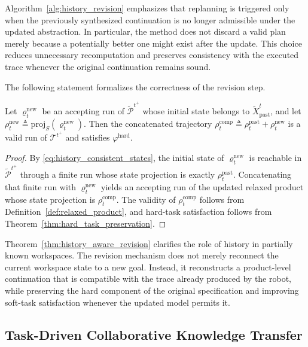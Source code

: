 Algorithm~\ref{alg:history_revision} emphasizes that replanning is triggered
only when the previously synthesized continuation is no longer admissible under
the updated abstraction. In particular, the method does not discard a valid plan
merely because a potentially better one might exist after the update. This
choice reduces unnecessary recomputation and preserves consistency with the
executed trace whenever the original continuation remains sound.

The following statement formalizes the correctness of the revision step.

\begin{theorem}
\label{thm:history_aware_revision}
Let $\varrho^{\mathrm{new}}_{t}$ be an accepting run of
$\widetilde{\mathcal{P}}^{t^+}$ whose initial state belongs to
$\widetilde{X}^{t}_{\mathrm{past}}$, and let
$\rho^{\mathrm{new}}_{t} \triangleq
\mathrm{proj}_{S}(\varrho^{\mathrm{new}}_{t})$.
Then the concatenated trajectory
$\rho^{\mathrm{comp}}_{t} \triangleq
\rho^{\mathrm{past}}_{t} + \rho^{\mathrm{new}}_{t}$ is a valid run of
$\mathcal{T}^{t^+}$ and satisfies $\varphi^{\mathrm{hard}}$.
\end{theorem}

\begin{proof}
By \eqref{eq:history_consistent_states}, the initial state of
$\varrho^{\mathrm{new}}_{t}$ is reachable in
$\widetilde{\mathcal{P}}^{t^+}$ through a finite run whose state projection is
exactly $\rho^{\mathrm{past}}_{t}$. Concatenating that finite run with
$\varrho^{\mathrm{new}}_{t}$ yields an accepting run of the updated relaxed
product whose state projection is $\rho^{\mathrm{comp}}_{t}$. The validity of
$\rho^{\mathrm{comp}}_{t}$ follows from
Definition~\ref{def:relaxed_product}, and hard-task satisfaction follows from
Theorem~\ref{thm:hard_task_preservation}.
\end{proof}

Theorem~\ref{thm:history_aware_revision} clarifies the role of history in
partially known workspaces. The revision mechanism does not merely reconnect the
current workspace state to a new goal. Instead, it reconstructs a product-level
continuation that is compatible with the trace already produced by the robot,
while preserving the hard component of the original specification and improving
soft-task satisfaction whenever the updated model permits it.

\subsection{Task-Driven Collaborative Knowledge Transfer}
\label{subsec:task_driven_transfer}

